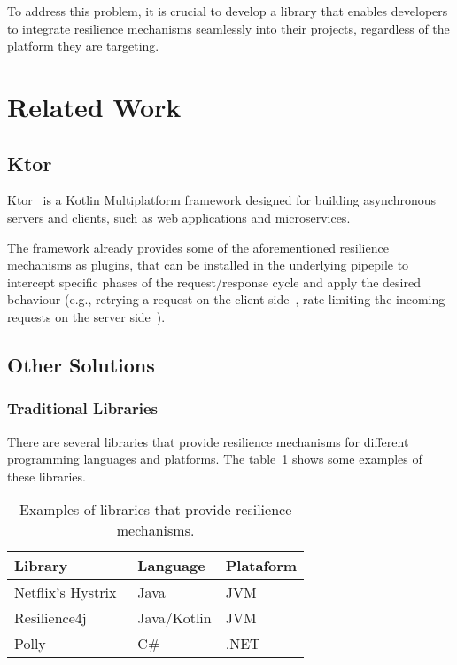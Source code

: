 To address this problem, it is crucial to develop a library that enables developers to integrate resilience mechanisms seamlessly into their projects, regardless of the platform they are targeting.


\section{Related Work}\label{sec:related-work}

\subsection{Ktor}\label{subsec:ktor}
Ktor~\cite{ktor} is a Kotlin Multiplatform framework designed for building asynchronous servers and clients, such as web applications and microservices.

The framework already provides some of the aforementioned resilience mechanisms as plugins,
that can be installed in the underlying pipepile
to intercept specific phases of the request/response cycle and apply the desired behaviour
(e.g., retrying a request on the client side~\cite{ktor-client-retry},
rate limiting the incoming requests on the server side~\cite{ktor-server-rate-limit}).

\subsection{Other Solutions}\label{subsec:other-solutions}

\subsubsection{Traditional Libraries}

There are several libraries that provide resilience mechanisms for different programming languages and platforms.
The table~\ref{tab:resilience_libraries} shows some examples of these libraries.

\begin{table}[!htb]
    \centering
    \caption{Examples of libraries that provide resilience mechanisms.}
    \label{tab:resilience_libraries}
    \vspace{0.3cm}
    \begin{tabular}{|l|l|l}
        \hline
        \textbf{Library}                         & \textbf{Language} & \textbf{Plataform} \\ \hline
        Netflix's Hystrix~\cite{netflix-hystrix} & Java              & JVM                \\ \hline
        Resilience4j~\cite{resilience4j}         & Java/Kotlin       & JVM                \\ \hline
        Polly ~\cite{polly-dotnet}               & C\#               & .NET               \\
        \hline
    \end{tabular}
\end{table}

